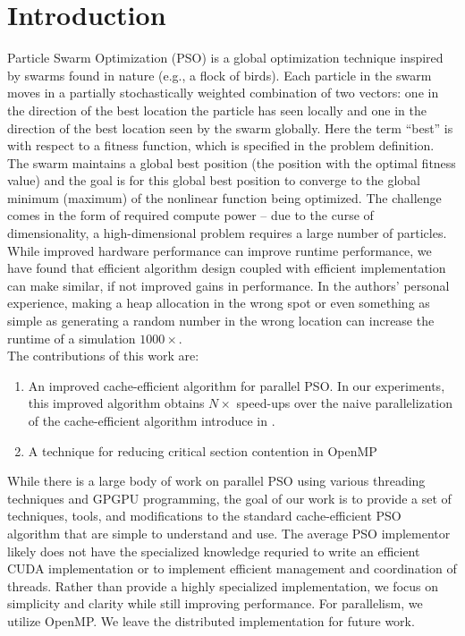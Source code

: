 \section{Introduction}
Particle Swarm Optimization (PSO) \cite{pso} is a global optimization technique
inspired by swarms found in nature (e.g., a flock of birds).
Each particle in the swarm moves in a partially stochastically weighted
combination of two vectors: one in the direction of the best location the
particle has seen locally and one in the direction of the best location seen by
the swarm globally. Here the term ``best'' is with respect to a fitness
function, which is specified in the problem definition.
The swarm maintains a global best position (the position
with the optimal fitness value) and the goal is for this global best position to
converge to the global minimum (maximum) of the nonlinear function being
optimized.  The challenge comes in the form of required compute power -- due to
the curse of dimensionality, a high-dimensional problem requires a large number
of particles. While improved hardware performance can
improve runtime performance, we have found that efficient algorithm
design coupled with efficient implementation can make similar, if not improved
gains in performance. In the authors'
personal experience, making a heap allocation in the wrong spot or even
something as simple as generating a random number in the wrong location can
increase the runtime of a simulation $1000\times$.\\
The contributions of this work are:

\begin{enumerate}
\item An improved cache-efficient algorithm for parallel PSO. In our
  experiments, this improved algorithm obtains $N\times$ speed-ups over the
  naive parallelization of the cache-efficient algorithm introduce in
  \cite{cache-pso}.
\item A technique for reducing critical section contention in OpenMP

\end{enumerate}

While there is a large body of work on parallel PSO using various threading
techniques and GPGPU programming, the goal of our work is to provide a set
of techniques, tools, and modifications to the standard cache-efficient PSO
algorithm that are simple to understand and use.
The average PSO implementor
likely does not have the specialized knowledge requried to write an efficient
CUDA implementation or to implement efficient management and coordination of
threads. Rather than provide a highly specialized implementation, we focus on
simplicity and clarity while still improving performance. For parallelism, we
utilize OpenMP. We leave the distributed implementation for future work.

